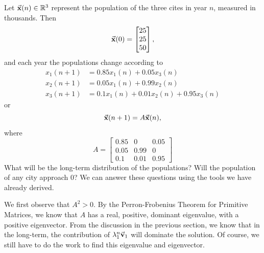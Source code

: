 Let $\vec{\textbf{x}}(n) \in \mathbb{R}^{3}$ represent the population of the three cites
in year $n$, measured in thousands.  Then
\begin{equation}
   \vec{\textbf{x}}(0)=\begin{bmatrix} 25 \\ 25 \\ 50 \end{bmatrix},
\end{equation}
and each year the populations change according to
\begin{equation}
\begin{split}
    x_1(n+1) & = 0.85 x_1(n) + 0.05x_3(n) \\
    x_2(n+1) & = 0.05x_1(n) + 0.99x_2(n)  \\
    x_3(n+1) & = 0.1x_1(n) + 0.01x_2(n) + 0.95x_3(n)
\end{split}
\end{equation}
or
\begin{equation}
    \vec{\textbf{x}}(n+1) = A\vec{\textbf{x}}(n),
\label{eqn:stoch:linmap}
\end{equation}
where
\begin{equation}
    A = \begin{bmatrix}
             0.85 & 0 & 0.05 \\
             0.05  & 0.99 & 0 \\
             0.1 & 0.01 & 0.95
        \end{bmatrix}
\end{equation}
What will be the long-term distribution of the populations?
Will the population of any city approach 0?
We can answer these questions using the tools we have already
derived.

We first observe that $A^2 > 0$.  By the Perron-Frobenius
Theorem for Primitive Matrices, we know that $A$ has
a real, positive, dominant eigenvalue, with a positive eigenvector.
From the discussion in the previous section, we know that
in the long-term, the contribution of $\lambda_1^n\vec{\textbf{v}}_1$ will
dominate the solution.
Of course, we still have to do the work to find this eigenvalue
and eigenvector.

